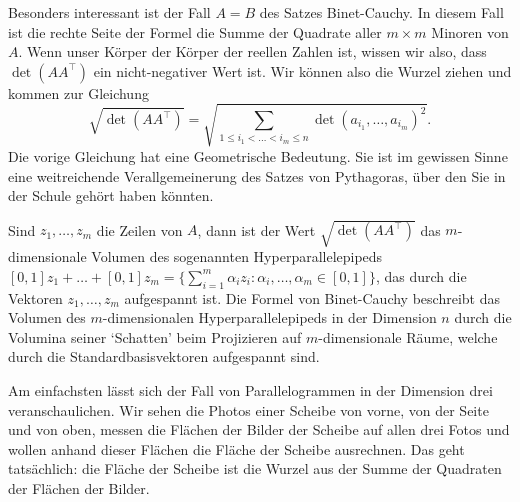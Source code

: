 \begin{bem} Besonders interessant ist der Fall $A =B$ des Satzes Binet-Cauchy. In diesem Fall ist die rechte Seite der Formel die Summe der Quadrate aller $m \times m$ Minoren von $A$. Wenn unser Körper der Körper der reellen Zahlen ist, wissen wir also, dass $\det(A A^\top)$ ein nicht-negativer Wert ist. Wir können also die Wurzel ziehen und kommen zur Gleichung
	\begin{equation*}
		\sqrt{\det(AA^\top)} = \sqrt{\sum_{1 \leq i_1 < \ldots < i_m \leq n} \det(a_{i_1}, \ldots, a_{i_m})^2}.
	\end{equation*}
	Die vorige Gleichung hat eine Geometrische Bedeutung. Sie ist im gewissen Sinne eine weitreichende Verallgemeinerung des Satzes von Pythagoras, über den Sie in der Schule gehört haben könnten. 


	Sind $z_1,\ldots,z_m$ die Zeilen von $A$, dann ist der Wert
	$ \sqrt{\det(AA^\top)} $ das $ m $-dimensionale Volumen des sogenannten  Hyperparallelepipeds $ [0,1]z_1 + \ldots + [0,1]z_m = \{ \sum_{i=1}^m \alpha_iz_i : \alpha_i, \ldots, \alpha_m \in [0,1] \} $,
	das durch die Vektoren $z_1,\ldots,z_m$ aufgespannt ist. Die Formel von Binet-Cauchy beschreibt das Volumen des $m$-dimensionalen Hyperparallelepipeds in der Dimension $n$ durch die Volumina seiner `Schatten'  beim Projizieren auf $m$-dimensionale Räume, welche durch die Standardbasisvektoren aufgespannt sind. 
	
	Am einfachsten lässt sich der Fall von Parallelogrammen in der Dimension drei veranschaulichen. Wir sehen die Photos einer Scheibe von vorne, von der Seite und von oben, messen die Flächen der Bilder der Scheibe auf allen drei Fotos und wollen anhand dieser Flächen die Fläche der Scheibe ausrechnen. Das geht tatsächlich: die Fläche der Scheibe ist die Wurzel aus der Summe der Quadraten der Flächen der Bilder. 
\end{bem}

